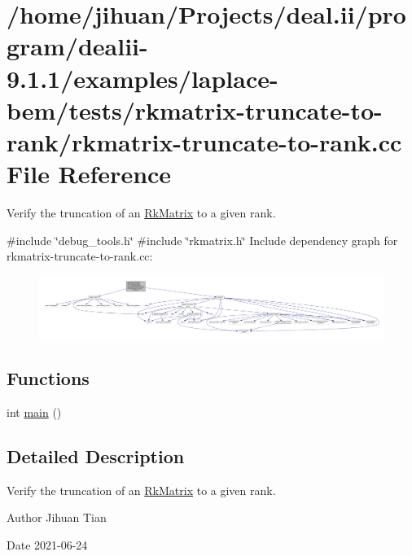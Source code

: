 \hypertarget{rkmatrix-truncate-to-rank_8cc}{}\section{/home/jihuan/\+Projects/deal.ii/program/dealii-\/9.1.1/examples/laplace-\/bem/tests/rkmatrix-\/truncate-\/to-\/rank/rkmatrix-\/truncate-\/to-\/rank.cc File Reference}
\label{rkmatrix-truncate-to-rank_8cc}


Verify the truncation of an \hyperlink{classRkMatrix}{Rk\+Matrix} to a given rank.  


{\ttfamily \#include \char`\"{}debug\+\_\+tools.\+h\char`\"{}}\newline
{\ttfamily \#include \char`\"{}rkmatrix.\+h\char`\"{}}\newline
Include dependency graph for rkmatrix-\/truncate-\/to-\/rank.cc\+:\nopagebreak
\begin{figure}[H]
\begin{center}
\leavevmode
\includegraphics[width=350pt]{rkmatrix-truncate-to-rank_8cc__incl}
\end{center}
\end{figure}
\subsection*{Functions}
\begin{DoxyCompactItemize}
\item 
int \hyperlink{rkmatrix-truncate-to-rank_8cc_ae66f6b31b5ad750f1fe042a706a4e3d4}{main} ()
\end{DoxyCompactItemize}


\subsection{Detailed Description}
Verify the truncation of an \hyperlink{classRkMatrix}{Rk\+Matrix} to a given rank. 

\begin{DoxyAuthor}{Author}
Jihuan Tian 
\end{DoxyAuthor}
\begin{DoxyDate}{Date}
2021-\/06-\/24 
\end{DoxyDate}



